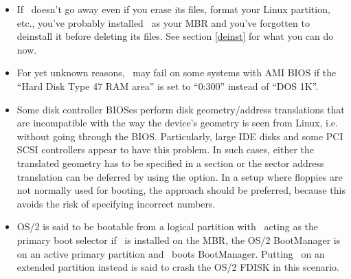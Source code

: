 \begin{itemize}
  \item If \LILO\ doesn't go away even if you erase its files, format your
    Linux partition, etc., you've probably installed \LILO\ as your MBR and
    you've forgotten to deinstall it before deleting its files. See section
    \ref{deinst} for what you can do now.
  \item For yet unknown reasons, \LILO\ may fail on some systems with
    AMI BIOS if the ``Hard Disk Type 47 RAM area'' is set to ``0:300''
    instead of ``DOS 1K''.
  \item Some disk controller BIOSes perform disk geometry/address translations
    that
    are incompatible with the way the device's geometry is seen from Linux,
    i.e. without going through the BIOS. Particularly, large IDE disks and
    some PCI SCSI
    controllers appear to have this problem. In such cases, either the
    translated geometry has to be specified in a  section or the
    sector address translation can be deferred by using the 
    option. In a setup where floppies are not normally used for booting,
    the  approach should be preferred, because this avoids
    the risk of specifying incorrect numbers.
  \item OS/2 is said to be bootable from a logical partition with
    \LILO\ acting as the primary boot selector if \LILO\ is installed on
    the MBR, the OS/2 BootManager is on an active primary partition and
    \LILO\ boots BootManager. Putting \LILO\ on an extended partition
    instead is said to crash the OS/2 FDISK in this scenario.


\end{itemize}
